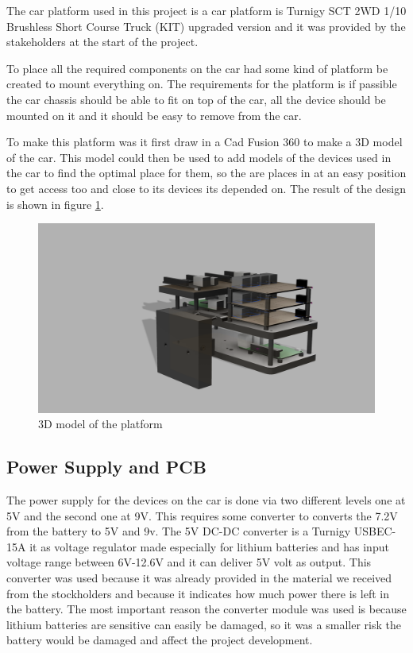 \documentclass[11pt, titlepage]{article} %
\begin{document}
The car platform used in this project is a car platform is Turnigy SCT 2WD 1/10 Brushless Short Course Truck (KIT) upgraded version and it was provided by the stakeholders at the start of the project. 

To place all the required components on the car had some kind of platform be created to mount everything on. The requirements for the platform is if passible the car chassis should be able to fit on top of the car, all the device should be mounted on it and it should be easy to remove from the car. 

To make this platform was it first draw in a Cad Fusion 360 to make a 3D model of the car. This model could then be used to add models of the devices used in the car to find the optimal place for them, so the are places in at an easy position to get access too and close to its devices its depended on. The result of the design is shown in figure \ref{fig:3d_platform}. 

\begin{figure}
	\includegraphics{platform.png}
	\caption{3D model of the platform}
	\label{fig:3d_platform}
\end{figure}

\subsection{Power Supply and PCB}

The power supply for the devices on the car is done via two different levels one at 5V and the second one at 9V. This requires some converter to converts the 7.2V from the battery to 5V and 9v. The 5V DC-DC converter is a Turnigy USBEC-15A it as voltage regulator made especially for lithium batteries and has input voltage range between 6V-12.6V and it can deliver 5V volt as output. This converter was used because it was already provided in the material we received from the stockholders and because it indicates how much power there is left in the battery. The most important reason the converter module was used is because lithium batteries are sensitive can easily be damaged, so it was a smaller risk the battery would be damaged and affect the project development. 
\end{document}
